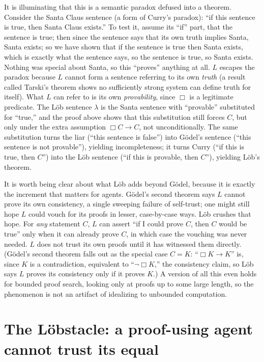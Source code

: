 \documentclass[10pt]{article}
\theoremstyle{definition}
\theoremstyle{remark}
\newcommand{\Prov}{\Box}              %
\begin{document}
It is illuminating that this is a semantic paradox defused into a theorem. Consider the Santa Claus sentence (a form of Curry's paradox): ``if this sentence is true, then Santa Claus exists.'' To test it, assume its ``if'' part, that the sentence is true; then since the sentence says that its own truth implies Santa, Santa exists; so we have shown that if the sentence is true then Santa exists, which is exactly what the sentence says, so the sentence is true, so Santa exists. Nothing was special about Santa, so this ``proves'' anything at all. $L$ escapes the paradox because $L$ cannot form a sentence referring to its own \emph{truth} (a result called Tarski's theorem shows no sufficiently strong system can define truth for itself). What $L$ can refer to is its own \emph{provability}, since $\Prov$ is a legitimate predicate. The L\"ob sentence $\lambda$ is the Santa sentence with ``provable'' substituted for ``true,'' and the proof above shows that this substitution still forces $C$, but only under the extra assumption $\Prov C \to C$, not unconditionally. The same substitution turns the liar (``this sentence is false'') into G\"odel's sentence (``this sentence is not provable''), yielding incompleteness; it turns Curry (``if this is true, then $C$'') into the L\"ob sentence (``if this is provable, then $C$''), yielding L\"ob's theorem.

It is worth being clear about what L\"ob adds beyond G\"odel, because it is exactly the increment that matters for agents. G\"odel's second theorem says $L$ cannot prove its own consistency, a single sweeping failure of self-trust; one might still hope $L$ could vouch for its proofs in lesser, case-by-case ways. L\"ob crushes that hope. For \emph{any} statement $C$, $L$ can assert ``if I could prove $C$, then $C$ would be true'' only when it can already prove $C$, in which case the vouching was never needed. $L$ does not trust its own proofs until it has witnessed them directly. (G\"odel's second theorem falls out as the special case $C = K$: ``$\Prov K \to K$'' is, since $K$ is a contradiction, equivalent to ``$\neg\Prov K$,'' the consistency claim, so L\"ob says $L$ proves its consistency only if it proves $K$.) A version of all this even holds for bounded proof search, looking only at proofs up to some large length, so the phenomenon is not an artifact of idealizing to unbounded computation.

\section{The L\"obstacle: a proof-using agent cannot trust its equal}
\label{sec:lobstacle}
\end{document}
